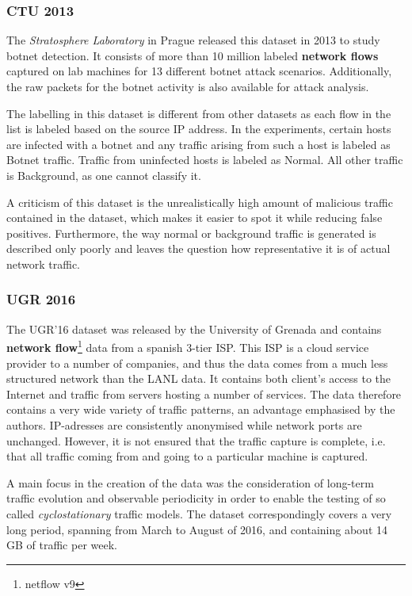 \documentclass[a4paper,12pt,twoside]{report}
\begin{document}
\subsubsection*{CTU 2013 \cite{noauthor_ctu-13_nodate, garcia2014empirical}}

The \textit{Stratosphere Laboratory} in Prague released this dataset in 2013 to study botnet detection. It consists of more than 10 million labeled \textbf{network flows} captured on lab machines for 13 different botnet attack scenarios. Additionally, the raw packets for the botnet activity is also available for attack analysis. 

The labelling in this dataset is different from other datasets as each  flow  in  the  list  is  labeled  based  on  the  source  IP  address.  In  the experiments,  certain  hosts  are  infected  with  a  botnet  and  any  traffic  arising from such a host is labeled as Botnet traffic. Traffic from uninfected hosts is labeled as Normal. All other traffic is Background, as one cannot classify it. 

A criticism of this dataset is the unrealistically high amount of malicious traffic contained in the dataset, which makes it easier to spot it while reducing false positives. Furthermore, the way normal or background traffic is generated is described only poorly and leaves the question how representative it is of actual network traffic.

\subsubsection*{UGR 2016 \cite{macia2018ugr}}

The UGR'16 dataset was released by the University of Grenada and contains \textbf{network flow}\footnote{netflow v9} data from a spanish 3-tier ISP. This ISP is a cloud service provider to a number of companies, and thus the data comes from a much less structured network than the LANL data. It contains both client's access to the Internet and traffic from servers hosting a number of services. The data therefore contains a very wide variety of traffic patterns, an advantage emphasised by the authors. IP-adresses are consistently anonymised while network ports are unchanged. However, it is not ensured that the traffic capture is complete, i.e. that all traffic coming from and going to a particular machine is captured.

A main focus in the creation of the data was the consideration of long-term traffic evolution and observable periodicity in order to enable the testing of so called \textit{cyclostationary} traffic models. The dataset correspondingly covers a very long period, spanning from March to August of 2016, and containing about 14 GB of traffic per week. 
\end{document}
